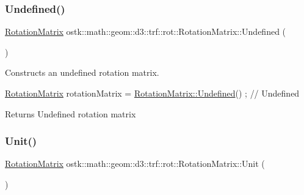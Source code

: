 \subsubsection{\texorpdfstring{Undefined()}{Undefined()}}
{\footnotesize\ttfamily \hyperlink{classostk_1_1math_1_1geom_1_1d3_1_1trf_1_1rot_1_1_rotation_matrix}{Rotation\+Matrix} ostk\+::math\+::geom\+::d3\+::trf\+::rot\+::\+Rotation\+Matrix\+::\+Undefined (\begin{DoxyParamCaption}{ }\end{DoxyParamCaption})\hspace{0.3cm}{\ttfamily [static]}}



Constructs an undefined rotation matrix. 


\begin{DoxyCode}
\hyperlink{classostk_1_1math_1_1geom_1_1d3_1_1trf_1_1rot_1_1_rotation_matrix_a5e6bed0779ad7db0c5bf26b2bd96f8ba}{RotationMatrix} rotationMatrix = \hyperlink{classostk_1_1math_1_1geom_1_1d3_1_1trf_1_1rot_1_1_rotation_matrix_aa0d194dc4e0504fe29cf593b5b6182f4}{RotationMatrix::Undefined}() ; \textcolor{comment}{//
       Undefined}
\end{DoxyCode}


\begin{DoxyReturn}{Returns}
Undefined rotation matrix 
\end{DoxyReturn}
\mbox{\label{classostk_1_1math_1_1geom_1_1d3_1_1trf_1_1rot_1_1_rotation_matrix_a37c25a2ddaa1dcd24be8dd568259a9b8}} 
\subsubsection{\texorpdfstring{Unit()}{Unit()}}
{\footnotesize\ttfamily \hyperlink{classostk_1_1math_1_1geom_1_1d3_1_1trf_1_1rot_1_1_rotation_matrix}{Rotation\+Matrix} ostk\+::math\+::geom\+::d3\+::trf\+::rot\+::\+Rotation\+Matrix\+::\+Unit (\begin{DoxyParamCaption}{ }\end{DoxyParamCaption})\hspace{0.3cm}{\ttfamily [static]}}



